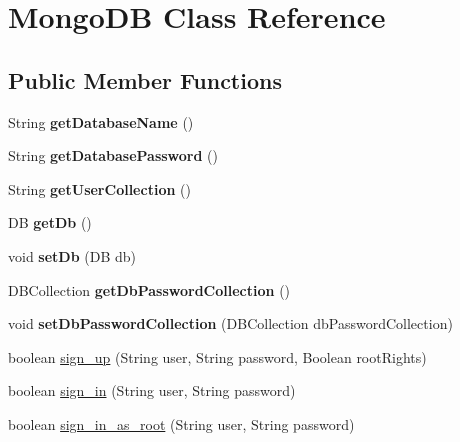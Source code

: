 \hypertarget{class_mongo_d_b}{}\section{Mongo\+DB Class Reference}
\label{class_mongo_d_b}
\subsection*{Public Member Functions}
\begin{DoxyCompactItemize}
\item 
\mbox{\label{class_mongo_d_b_a5e60a5605d070637ce60a3dc4e67138a}} 
String {\bfseries get\+Database\+Name} ()
\item 
\mbox{\label{class_mongo_d_b_a86a8fe83d594dc26f709b9e048c79fe6}} 
String {\bfseries get\+Database\+Password} ()
\item 
\mbox{\label{class_mongo_d_b_adf1dfa43d61be69c1673bb8ddfeb210e}} 
String {\bfseries get\+User\+Collection} ()
\item 
\mbox{\label{class_mongo_d_b_a70007164c403cb52ac8e87b0137aa27e}} 
DB {\bfseries get\+Db} ()
\item 
\mbox{\label{class_mongo_d_b_afa9b1ff69f975af22fdff7860c600c8e}} 
void {\bfseries set\+Db} (DB db)
\item 
\mbox{\label{class_mongo_d_b_aa46409219a8b26d1b0a229e464be7258}} 
D\+B\+Collection {\bfseries get\+Db\+Password\+Collection} ()
\item 
\mbox{\label{class_mongo_d_b_a54e2ada48adc6b47a40d5092113b2369}} 
void {\bfseries set\+Db\+Password\+Collection} (D\+B\+Collection db\+Password\+Collection)
\item 
boolean \hyperlink{class_mongo_d_b_a9c69be7c091bffc9d1950e118fdb2251}{sign\+\_\+up} (String user, String password, Boolean root\+Rights)
\item 
boolean \hyperlink{class_mongo_d_b_a672df0039a1fcd302bd399089bb7fe28}{sign\+\_\+in} (String user, String password)
\item 
boolean \hyperlink{class_mongo_d_b_afa13d12f56548fcf6c5ca12ec66bc73c}{sign\+\_\+in\+\_\+as\+\_\+root} (String user, String password)

\end{DoxyCompactItemize}
